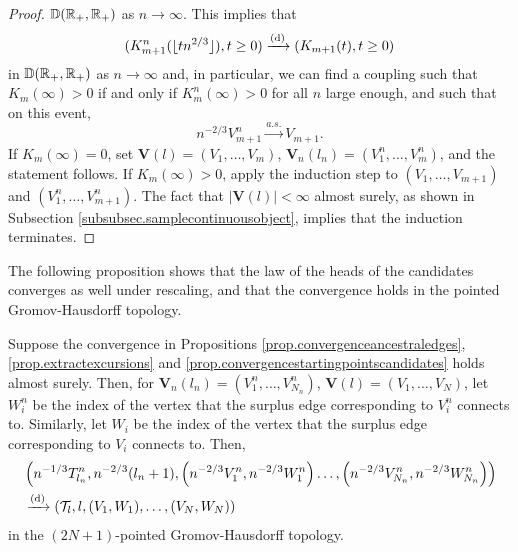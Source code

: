 \begin{proof}
${\mathbb D}({\mathbb R}_+,{\mathbb R}_+)$ as $n\to\infty$. This implies that 
$$(K^n_{m+1}(\lfloor t n^{2/3} \rfloor ),t\geq 0)\xrightarrow[]{\mathrm{(d)}} (K_{m+1}(t),t\geq 0)$$ in ${\mathbb D}({\mathbb R}_+,{\mathbb R}_+)$ as $n\to\infty$ and, in particular, we can find a coupling such that $K_m(\infty)>0$ if and only if $K^n_m(\infty)>0$ for all $n$ large enough, and such that on this event,
$$n^{-2/3}V_{m+1}^n\overset{a.s.}{\to}V_{m+1}.$$
If $K_m(\infty)=0$, set $\mathbf{V}(l)=(V_1,\dots,V_m)$, $\mathbf{V}_n(l_n)=(V^n_1,\dots,V^n_m)$, and the statement follows. If $K_m(\infty)>0$, apply the induction step to $(V_1,\dots,V_{m+1})$ and $(V^n_1,\dots,V^n_{m+1})$. The fact that $|\mathbf{V}(l)|<\infty$ almost surely, as shown in Subsection \ref{subsubsec.samplecontinuousobject}, implies that the induction terminates.
\end{proof}

The following proposition shows that the law of the heads of the candidates converges as well under rescaling, and that the convergence holds in the pointed Gromov-Hausdorff topology. 
\begin{proposition}\label{prop.convergenceheadscandidates}
Suppose the convergence in Propositions \ref{prop.convergenceancestraledges}, \ref{prop.extractexcursions} and \ref{prop.convergencestartingpointscandidates} holds almost surely. Then, for $\mathbf{V}_n(l_n)=(V^n_1,\dots, V^n_{N_n})$, $\mathbf{V}(l)=(V_1,\dots, V_{N})$, let $W^n_i$ be the index of the vertex that the surplus edge corresponding to $V^n_i$ connects to. Similarly, let $W_i$ be the index of the vertex that the surplus edge corresponding to $V_i$ connects to. Then, 
\begin{align*}&\left(n^{-1/3}T^n_{l_n}, n^{-2/3}(l_n+1), \left(n^{-2/3}V^n_1,n^{-2/3}W^n_1\right) \dots, \left(n^{-2/3}V^n_{N_n}, n^{-2/3}W^n_{N_n}\right)\right)\\
&\todist\left(\cT_l, l, (V_1,W_1),\dots, (V_{N},W_{N})\right)\end{align*}
in the $(2N+1)$-pointed Gromov-Hausdorff topology. 
\end{proposition}
